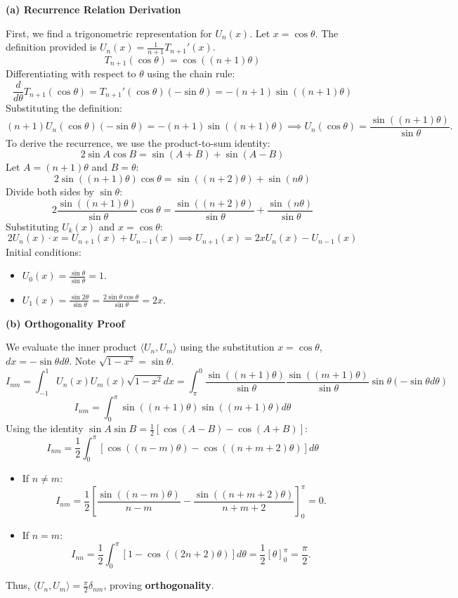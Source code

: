 \begin{solution}
\textbf{(a) Recurrence Relation Derivation}

First, we find a trigonometric representation for $U_n(x)$. Let $x = \cos\theta$.
The definition provided is $U_n(x) = \frac{1}{n+1} T_{n+1}'(x)$.
\[ T_{n+1}(\cos\theta) = \cos((n+1)\theta) \]
Differentiating with respect to $\theta$ using the chain rule:
\[ \frac{d}{d\theta} T_{n+1}(\cos\theta) = T_{n+1}'(\cos\theta) (-\sin\theta) = -(n+1) \sin((n+1)\theta) \]
Substituting the definition:
\[ (n+1) U_n(\cos\theta) (-\sin\theta) = -(n+1) \sin((n+1)\theta) \implies U_n(\cos\theta) = \frac{\sin((n+1)\theta)}{\sin\theta}. \]
To derive the recurrence, we use the product-to-sum identity:
\[ 2 \sin A \cos B = \sin(A+B) + \sin(A-B) \]
Let $A = (n+1)\theta$ and $B = \theta$:
\[ 2 \sin((n+1)\theta) \cos\theta = \sin((n+2)\theta) + \sin(n\theta) \]
Divide both sides by $\sin\theta$:
\[ 2 \frac{\sin((n+1)\theta)}{\sin\theta} \cos\theta = \frac{\sin((n+2)\theta)}{\sin\theta} + \frac{\sin(n\theta)}{\sin\theta} \]
Substituting $U_k(x)$ and $x = \cos\theta$:
\[ 2 U_n(x) \cdot x = U_{n+1}(x) + U_{n-1}(x) \implies \boxed{U_{n+1}(x) = 2x U_n(x) - U_{n-1}(x)} \]
Initial conditions:
\begin{itemize}
    \item $U_0(x) = \frac{\sin\theta}{\sin\theta} = 1$.
    \item $U_1(x) = \frac{\sin 2\theta}{\sin\theta} = \frac{2 \sin\theta \cos\theta}{\sin\theta} = 2x$.
\end{itemize}

\textbf{(b) Orthogonality Proof}

We evaluate the inner product $\langle U_n, U_m \rangle$ using the substitution $x = \cos\theta$, $dx = -\sin\theta d\theta$. Note $\sqrt{1-x^2} = \sin\theta$.
\[ I_{nm} = \int_{-1}^1 U_n(x) U_m(x) \sqrt{1-x^2} dx = \int_{\pi}^0 \frac{\sin((n+1)\theta)}{\sin\theta} \frac{\sin((m+1)\theta)}{\sin\theta} \sin\theta (-\sin\theta d\theta) \]
\[ I_{nm} = \int_0^\pi \sin((n+1)\theta) \sin((m+1)\theta) d\theta \]
Using the identity $\sin A \sin B = \frac{1}{2}[\cos(A-B) - \cos(A+B)]$:
\[ I_{nm} = \frac{1}{2} \int_0^\pi [\cos((n-m)\theta) - \cos((n+m+2)\theta)] d\theta \]
\begin{itemize}
    \item If $n \neq m$:
    \[ I_{nm} = \frac{1}{2} \left[ \frac{\sin((n-m)\theta)}{n-m} - \frac{\sin((n+m+2)\theta)}{n+m+2} \right]_0^\pi = 0. \]
    \item If $n = m$:
    \[ I_{nn} = \frac{1}{2} \int_0^\pi [1 - \cos((2n+2)\theta)] d\theta = \frac{1}{2} [\theta]_0^\pi = \frac{\pi}{2}. \]
\end{itemize}
Thus, $\langle U_n, U_m \rangle = \frac{\pi}{2} \delta_{nm}$, proving \textbf{orthogonality}.


\end{solution}
